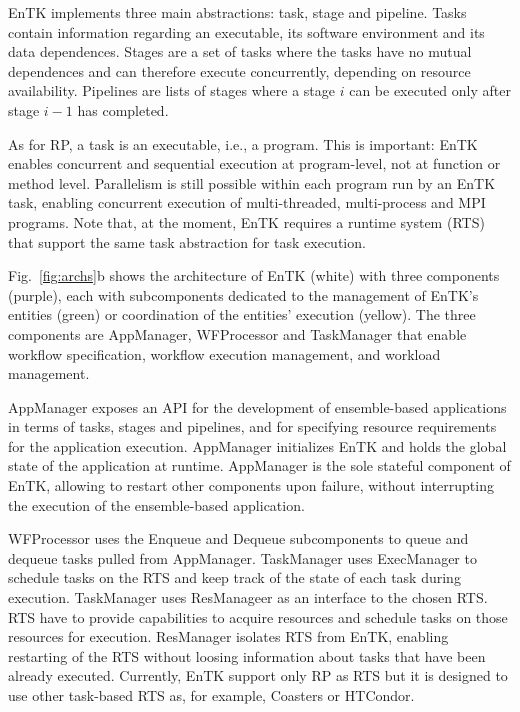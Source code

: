 \documentclass[preprint,12pt, a4paper]{elsarticle}
\begin{document}
EnTK implements three main abstractions: task, stage and pipeline. Tasks
contain information regarding an executable, its software environment and its
data dependences. Stages are a set of tasks where the tasks have no mutual
dependences and can therefore execute concurrently, depending on resource
availability. Pipelines are lists of stages where a stage \(i\) can be
executed only after stage \(i-1\) has completed.


As for RP, a task is an executable, i.e., a program. This is important: EnTK
enables concurrent and sequential execution at program-level, not at function
or method level. Parallelism is still possible within each program run by an
EnTK task, enabling concurrent execution of multi-threaded, multi-process and
MPI programs. Note that, at the moment, EnTK requires a runtime system (RTS)
that support the same task abstraction for task execution.

Fig.~\ref{fig:archs}b shows the architecture of EnTK (white) with three
components (purple), each with subcomponents dedicated to the management of
EnTK's entities (green) or coordination of the entities' execution (yellow).
The three components are AppManager, WFProcessor and TaskManager that enable
workflow specification, workflow execution management, and workload
management.

AppManager exposes an API for the development of ensemble-based applications
in terms of tasks, stages and pipelines, and for specifying resource
requirements for the application execution. AppManager initializes EnTK and
holds the global state of the application at runtime. AppManager is the sole
stateful component of EnTK, allowing to restart other components upon
failure, without interrupting the execution of the ensemble-based
application.

WFProcessor uses the Enqueue and Dequeue subcomponents to queue and dequeue
tasks pulled from AppManager. TaskManager uses ExecManager to schedule tasks
on the RTS and keep track of the state of each task during execution.
TaskManager uses ResManageer as an interface to the chosen RTS. RTS have to
provide capabilities to acquire resources and schedule tasks on those
resources for execution. ResManager isolates RTS from EnTK, enabling
restarting of the RTS without loosing information about tasks that have been
already executed. Currently, EnTK support only RP as RTS but it is designed
to use other task-based RTS as, for example, Coasters or HTCondor.
\end{document}

